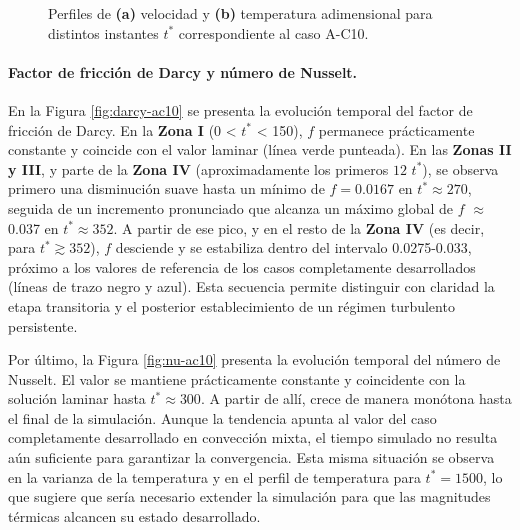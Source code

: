 \begin{figure}[H]
  \centering  
  
  \caption{Perfiles de \textbf{(a)} velocidad y \textbf{(b)} temperatura adimensional para distintos instantes $t^*$ correspondiente al caso A-C10.}
  \label{fig:mosaico-ac10}
\end{figure}

\paragraph{Factor de fricción de Darcy y número de Nusselt.}
En la Figura \ref{fig:darcy-ac10} se presenta la evolución temporal del factor de fricción de Darcy. En la \textbf{Zona I} (0 < $t^*$ < 150), $f$ permanece prácticamente constante y coincide con el valor laminar (línea verde punteada). En las \textbf{Zonas II y III}, y parte de la \textbf{Zona IV} (aproximadamente los primeros $12$ $t^*$), se observa primero una disminución suave hasta un mínimo de $f=0.0167$ en $t^*\approx270$, seguida de un incremento pronunciado que alcanza un máximo global de $f$ $\approx$ 0.037 en $t^*\approx352$. A partir de ese pico, y en el resto de la \textbf{Zona IV} (es decir, para $t^*\gtrsim352$), $f$ desciende y se estabiliza dentro del intervalo 0.0275-0.033, próximo a los valores de referencia de los casos completamente desarrollados (líneas de trazo negro y azul). Esta secuencia permite distinguir con claridad la etapa transitoria y el posterior establecimiento de un régimen turbulento persistente.

Por último, la Figura \ref{fig:nu-ac10} presenta la evolución temporal del número de Nusselt. El valor se mantiene prácticamente constante y coincidente con la solución laminar hasta $t^* \approx 300$. A partir de allí, crece de manera monótona hasta el final de la simulación. Aunque la tendencia apunta al valor del caso completamente desarrollado en convección mixta, el tiempo simulado no resulta aún suficiente para garantizar la convergencia. Esta misma situación se observa en la varianza de la temperatura y en el perfil de temperatura para $t^*=1500$, lo que sugiere que sería necesario extender la simulación para que las magnitudes térmicas alcancen su estado desarrollado.

